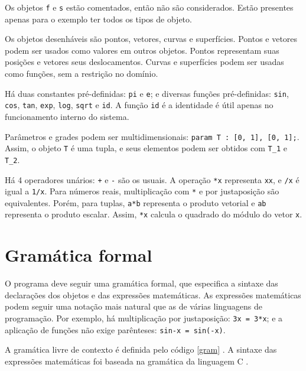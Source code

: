 Os objetos \texttt{f} e \texttt{s} estão comentados, então não são considerados.
Estão presentes apenas para o exemplo ter todos os tipos de objeto.

Os objetos desenháveis são pontos, vetores, curvas e superfícies.
Pontos e vetores podem ser usados como valores em outros objetos.
Pontos representam suas posições e vetores seus deslocamentos.
Curvas e superfícies podem ser usadas como funções, sem a restrição no domínio.

Há duas constantes pré-definidas: \texttt{pi} e \texttt{e}; e diversas funções pré-definidas:
\texttt{sin}, \texttt{cos}, \texttt{tan},
\texttt{exp}, \texttt{log}, \texttt{sqrt} e \texttt{id}.
A função \texttt{id} é a identidade é útil apenas no funcionamento interno do sistema.

Parâmetros e grades podem ser multidimensionais:
\texttt{param T : [0, 1], [0, 1];}. Assim, o objeto \texttt{T} é uma tupla,
e seus elementos podem ser obtidos com \texttt{T\_1} e \texttt{T\_2}.

Há 4 operadores unários: \texttt{+} e \texttt{-} são os usuais.
A operação \texttt{*x} representa \texttt{xx}, e \texttt{/x} é igual a \texttt{1/x}.
Para números reais, multiplicação com \texttt{*} e por justaposição são equivalentes.
Porém, para tuplas, \texttt{a*b} representa o produto vetorial
e \texttt{ab} representa o produto escalar.
Assim, \texttt{*x} calcula o quadrado do módulo do vetor \texttt{x}.

\section{Gramática formal}
O programa deve seguir uma gramática formal, 
que especifica a sintaxe das declarações dos objetos e das expressões matemáticas.
As expressões matemáticas podem seguir uma notação mais natural
que as de várias linguagens de programação.
Por exemplo, há multiplicação por justaposição: \texttt{3x = 3*x};
e a aplicação de funções não exige parênteses: \texttt{sin-x = sin(-x)}.

A gramática livre de contexto é definida pelo código \ref{gram} \cite{Dragon:1}.
A sintaxe das expressões matemáticas foi baseada na gramática da linguagem C \cite{CGram}.

